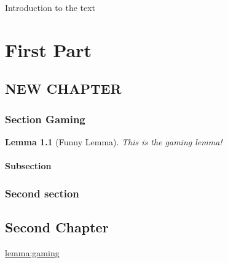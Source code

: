 \newtheorem{lemma}{Lemma}[section]

\newcommand{\gamer}{gaming}

Introduction to the text

\part{First Part}
\label{part:1}

\chapter{NEW CHAPTER}
\label{chapter:new}

\section{Section Gaming}
\begin{lemma}[Funny Lemma]
    \label{lemma:gaming}
    This is the gaming lemma!
\end{lemma}

\subsection{Subsection}

\section{Second section}



\chapter{Second Chapter}
\label{chapter:second}
\hyperref[hehehe]{lemma:gaming}

\cite[hehehe{{\hehe}}]{Evans}



